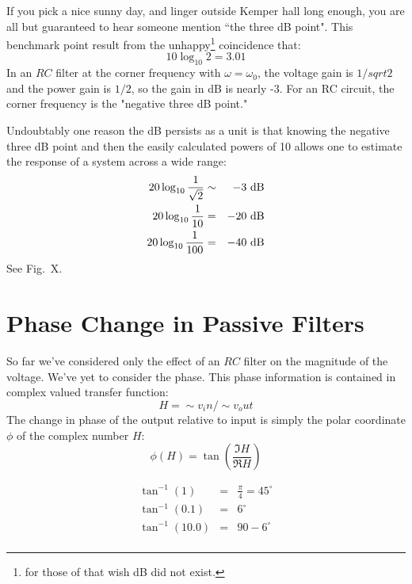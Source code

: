 \documentclass[12pt,oneside]{book}
\begin{document}
If you pick a nice sunny day, and linger outside Kemper hall long enough, you are all but guaranteed to hear someone mention ``the three dB point".   This benchmark point result from the unhappy\footnote{for those of that wish dB did not exist.} coincidence that:
\begin{equation*}
10 \log_{10} 2 = 3.01
\end{equation*}
In an $RC$ filter at the corner frequency with $\omega = \omega_0$, the voltage gain is $1/sqrt{2}$ and the power gain is $1/2$, so the gain in dB is nearly -3.  For an RC circuit, the corner frequency is the "negative three dB point."

Undoubtably one reason the dB persists as a unit is that knowing the negative three dB point and then the easily calculated powers of 10 allows one to estimate the response of a system across a wide range:
\begin{eqnarray*}
20 \log_{10} \frac{1}{\sqrt{2}} &\sim& -3~\rm dB\\
20 \log_{10} \frac{1}{10} &=& -20~\rm dB\\
20 \log_{10} \frac{1}{100} &=& -40~\rm dB\\
\end{eqnarray*}
See Fig.~X.

\section{Phase Change in Passive Filters}

So far we've considered only the effect of an $RC$ filter on the magnitude of the voltage.  We've yet to consider the phase.  This phase information is contained in complex valued transfer function:
\begin{displaymath}
H = \sim{v}_in / \sim{v}_out
\end{displaymath}
The change in phase of the output relative to input is simply the polar coordinate $\phi$ of the complex number $H$:
\begin{displaymath}
\phi(H) = \tan\left( \frac{\Im{H}}{\Re{H}}\right)
\end{displaymath}


\begin{eqnarray*}
\tan^{-1}(1)  &=& \frac{\pi}{4} = 45^\circ\\
\tan^{-1}(0.1)  &=& 6^\circ\\
\tan^{-1}(10.0)  &=& 90 - 6^\circ\\
\end{eqnarray*}
\end{document}
